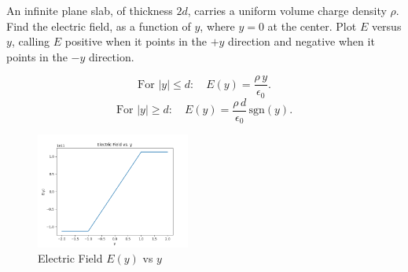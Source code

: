 \begin{hwkProblem}{2.17}{}

	An infinite plane slab, of thickness \( 2d \), carries a uniform volume charge density \( \rho \). Find the electric field, as a function of \( y \), where \( y=0 \) at the center. Plot \( E \) versus \( y \), calling \( E \) positive when it points in the \( +y \) direction and negative when it points in the \( -y \) direction.

	\hwkSol

		\[
	\text{For } |y|\le d:\quad E(y)=\frac{\rho\,y}{\epsilon_0}.
	\]
	\[
	\text{For } |y|\ge d:\quad E(y)=\frac{\rho\,d}{\epsilon_0}\,\mathrm{sgn}(y).
	\]
	\hwkPart
	
	\begin{figure}[ht]
		\begin{center}
			\includegraphics[width=0.45\textwidth]{./images/s2_17.png}
		\end{center}
		\caption{Electric Field \( E(y) \) vs \( y \)}\label{fig:s2_17}
	\end{figure}

\end{hwkProblem}
